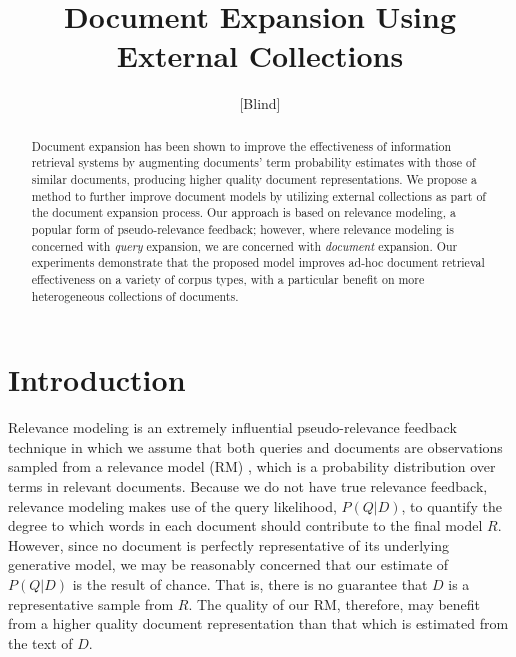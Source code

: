 \documentclass{sig-alternate}
\begin{document}
\author{[Blind]}

\title{Document Expansion Using External Collections}

\maketitle
\begin{abstract}
Document expansion has been shown to improve the effectiveness of information retrieval systems by augmenting documents' term probability estimates with those of similar documents, producing higher quality document representations. We propose a method to further improve document models by utilizing external collections as part of the document expansion process. Our approach is based on relevance modeling, a popular form of pseudo-relevance feedback; however, where relevance modeling is concerned with \textit{query} expansion, we are concerned with \textit{document} expansion. Our experiments demonstrate that the proposed model improves ad-hoc document retrieval effectiveness on a variety of corpus types, with a particular benefit on more heterogeneous collections of documents.
\end{abstract}

\section{Introduction}\label{section.intro}


Relevance modeling is an extremely influential pseudo-relevance feedback technique in which we assume that both queries and documents are observations sampled from a relevance model (RM) \cite{Lavrenko2001}, which is a probability distribution over terms in relevant documents. Because we do not have true relevance feedback, relevance modeling makes use of the query likelihood, $P(Q|D)$, to quantify the degree to which words in each document should contribute to the final model $R$. However, since no document is perfectly representative of its underlying generative model, we may be reasonably concerned that our estimate of $P(Q|D)$ is the result of chance. That is, there is no guarantee that $D$ is a representative sample from $R$. The quality of our RM, therefore, may benefit from a higher quality document representation than that which is estimated from the text of $D$.
\end{document}
